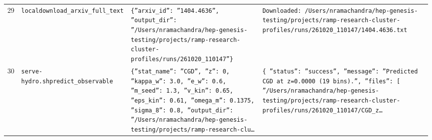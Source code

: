 \documentclass[11pt,a4paper]{article}
\begin{document}
\begin{longtable}{@{}p{}p{}p{}p{}@{}}
29 & \texttt{local}\newline\texttt{download\_\allowbreak{}arxiv\_\allowbreak{}full\_\allowbreak{}text} & \texttt{\{''arxiv\_\allowbreak{}id'':\allowbreak{} ''1404.4636'',\allowbreak{} ''output\_\allowbreak{}dir'':\allowbreak{} ''/\allowbreak{}Users/\allowbreak{}nramachandra/\allowbreak{}hep-genesis-testing/\allowbreak{}projects/\allowbreak{}ramp-research-cluster-profiles/\allowbreak{}runs/\allowbreak{}261020\_\allowbreak{}110147''\}\allowbreak{}} & \texttt{Downloaded:\allowbreak{} /\allowbreak{}Users/\allowbreak{}nramachandra/\allowbreak{}hep-genesis-testing/\allowbreak{}projects/\allowbreak{}ramp-research-cluster-profiles/\allowbreak{}runs/\allowbreak{}261020\_\allowbreak{}110147/\allowbreak{}1404.4636.txt} \\
30 & \texttt{serve-hydro.sh}\newline\texttt{predict\_\allowbreak{}observable} & \texttt{\{''stat\_\allowbreak{}name'':\allowbreak{} ''CGD'',\allowbreak{} ''z'':\allowbreak{} 0,\allowbreak{} ''kappa\_\allowbreak{}w'':\allowbreak{} 3.0,\allowbreak{} ''e\_\allowbreak{}w'':\allowbreak{} 0.6,\allowbreak{} ''m\_\allowbreak{}seed'':\allowbreak{} 1.3,\allowbreak{} ''v\_\allowbreak{}kin'':\allowbreak{} 0.65,\allowbreak{} ''eps\_\allowbreak{}kin'':\allowbreak{} 0.61,\allowbreak{} ''omega\_\allowbreak{}m'':\allowbreak{} 0.1375,\allowbreak{} ''sigma\_\allowbreak{}8'':\allowbreak{} 0.8,\allowbreak{} ''output\_\allowbreak{}dir'':\allowbreak{} ''/\allowbreak{}Users/\allowbreak{}nramachandra/\allowbreak{}hep-genesis-testing/\allowbreak{}projects/\allowbreak{}ramp-research-clu\ldots{}\allowbreak{}} & \texttt{\{   ''status'':\allowbreak{} ''success'',\allowbreak{}   ''message'':\allowbreak{} ''Predicted CGD at z=\allowbreak{}0.0000 (19 bins)\allowbreak{}.'',\allowbreak{}   ''files'':\allowbreak{} [     ''/\allowbreak{}Users/\allowbreak{}nramachandra/\allowbreak{}hep-genesis-testing/\allowbreak{}projects/\allowbreak{}ramp-research-cluster-profiles/\allowbreak{}runs/\allowbreak{}261020\_\allowbreak{}110147/\allowbreak{}CGD\_\allowbreak{}z\ldots{}\allowbreak{}} \\

\end{longtable}
\end{document}
